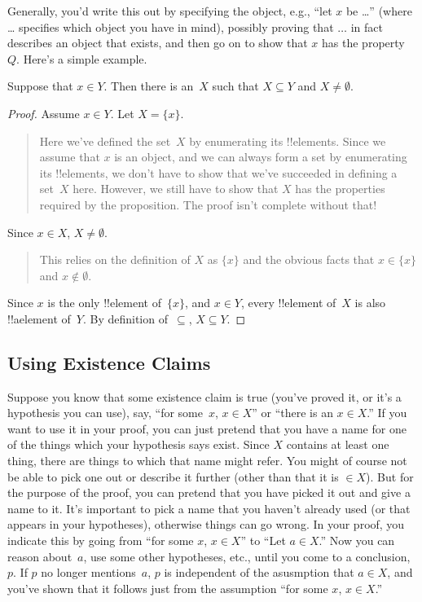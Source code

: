 \documentclass[../../../include/open-logic-section]{subfiles}
\begin{document}
Generally, you'd write this out by specifying the object, e.g., ``let
$x$ be \dots'' (where \dots{} specifies which object you have in
mind), possibly proving that $\dots$ in fact describes an object that
exists, and then go on to show that $x$ has the property~$Q$. Here's a
simple example.

\begin{prop}
  Suppose that $x \in Y$. Then there is an~$X$ such that $X \subseteq
  Y$ and $X \neq \emptyset$.
\end{prop}

\begin{proof}
  Assume $x \in Y$. Let $X = \{x\}$.
  \begin{quote}
    Here we've defined the set~$X$ by enumerating its
    !!{element}s. Since we assume that $x$ is an object, and we can
    always form a set by enumerating its !!{element}s, we don't have
    to show that we've succeeded in defining a set~$X$ here.  However,
    we still have to show that $X$ has the properties required by the
    proposition. The proof isn't complete without that!{}
  \end{quote}
  Since $x \in X$, $X \neq \emptyset$.
  \begin{quote}
    This relies on the definition of $X$ as $\{x\}$ and the obvious
    facts that $x \in \{x\}$ and $x \notin \emptyset$.
  \end{quote}
  Since $x$ is the only !!{element} of~$\{x\}$, and $x \in Y$, every
  !!{element} of~$X$ is also !!a{element} of~$Y$. By definition
  of~$\subseteq$, $X \subseteq Y$.
\end{proof}

\subsection{Using Existence Claims}

Suppose you know that some existence claim is true (you've proved it,
or it's a hypothesis you can use), say, ``for some~$x$, $x \in X$'' or
``there is an $x \in X$.''  If you want to use it in your proof, you
can just pretend that you have a name for one of the things which your
hypothesis says exist. Since $X$ contains at least one thing, there
are things to which that name might refer. You might of course not be
able to pick one out or describe it further (other than that it is
$\in X$). But for the purpose of the proof, you can pretend that you
have picked it out and give a name to it. It's important to pick a
name that you haven't already used (or that appears in your
hypotheses), otherwise things can go wrong. In your proof, you
indicate this by going from ``for some $x$, $x \in X$'' to ``Let $a
\in X$.''  Now you can reason about~$a$, use some other hypotheses, etc.,
until you come to a conclusion, $p$. If $p$ no longer mentions~$a$, $p$ is
independent of the asusmption that $a \in X$, and you've shown that it
follows just from the assumption ``for some $x$, $x \in X$.''
\end{document}
